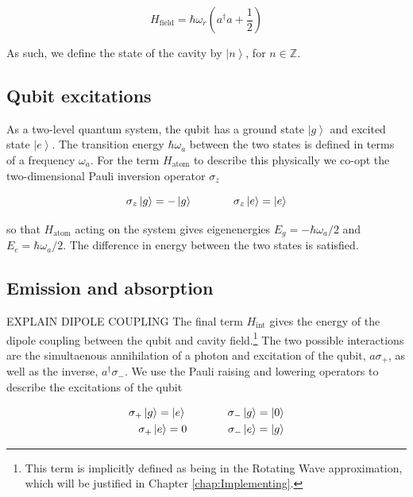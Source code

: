\documentclass[12 pt]{book}
\newcommand{\ket}[1]{\left| #1 \right>} %
\begin{document}
\begin{equation}
H_{\mathrm{field}}=\hbar \omega_r(a^\dag a+\frac{1}{2})
\end{equation}

As such, we define the state of the cavity by $\ket{n}$, for $n \in \mathbb{Z}$.

\subsection{Qubit excitations}
As a two-level quantum system, the qubit has a ground state $\ket{g}$ and excited state $\ket{e}$. The transition energy $\hbar \omega_a$ between the two states is defined in terms of a frequency $\omega_a$. For the term $H_{\mathrm{atom}}$ to describe this physically we co-opt the two-dimensional Pauli inversion operator $\sigma_z$

\begin{equation}
\sigma_z\ket{g}=-\ket{g} \hspace{1.3cm} \sigma_z\ket{e}=\ket{e}
\end{equation}

so that $H_{\mathrm{atom}}$ acting on the system gives eigenenergies $E_g=-\hbar\omega_a/2$ and $E_e=\hbar\omega_a/2$. The difference in energy between the two states is satisfied. 

\subsection{Emission and absorption}\label{sec:Emission}
EXPLAIN DIPOLE COUPLING
The final term $H_{\mathrm{int}}$ gives the energy of the dipole coupling between the qubit and cavity field.\footnote{This term is implicitly defined as being in the Rotating Wave approximation, which will be justified in Chapter \ref{chap:Implementing}.} The two possible interactions are the simultaenous annihilation of a photon and excitation of the qubit, $a\sigma_+$, as well as the inverse, $a^\dag \sigma_-$. We use the Pauli raising and lowering operators to describe the excitations of the qubit

\begin{eqnarray}
\sigma_+\ket{g} = \ket{e} \hspace{1.3cm} \sigma_-\ket{g} = \ket{0} \\
\sigma_+\ket{e} = 0\hspace{1.3cm} \sigma_-\ket{e} = \ket{g} \nonumber
\end{eqnarray}
\end{document}
